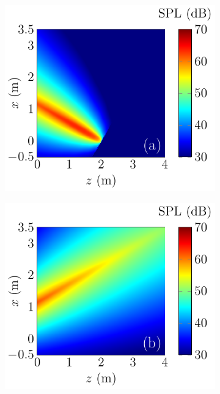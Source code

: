 \begin{figure}[!htb]
    \centering
    \begin{subfigure}{0.32\textwidth}
        \centering
        \includegraphics[width = \textwidth]{fig/ComputePalReflectionTruncated_Ultra60000_LocSurface2m_Orignal_211013N.pdf}
    \end{subfigure}
    \begin{subfigure}{0.32\textwidth}
        \centering
        \includegraphics[width = \textwidth]{fig/ComputePalReflectionTruncated_Ultra60000_LocSurface2m_Image_211013O.pdf}

\end{subfigure}
\end{figure}
